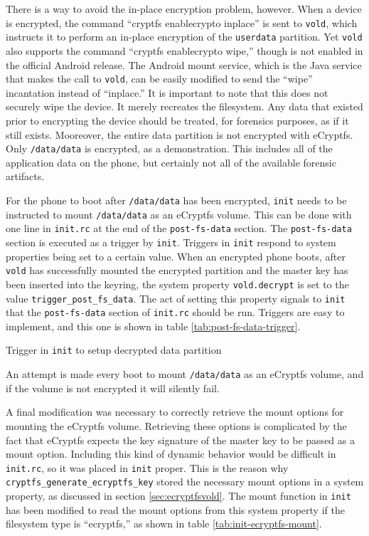 There is a way to avoid the in-place encryption problem, however. When a device is encrypted, the command ``cryptfs enablecrypto
inplace'' is sent to \texttt{vold}, which instructs it to perform an in-place encryption of the \texttt{userdata} partition. Yet
\texttt{vold} also supports the command ``cryptfs enablecrypto wipe,'' though is not enabled in the official Android release. The
Android mount service, which is the Java service that makes the call to \texttt{vold}, can be easily modified to send the ``wipe''
incantation instead of ``inplace.'' It is important to note that this does not securely wipe the device. It merely recreates the
filesystem. Any data that existed prior to encrypting the device should be treated, for forensics purposes, as if it still exists.
Mooreover, the entire data partition is not encrypted with eCryptfs. Only \texttt{/data/data} is encrypted, as a demonstration. This
includes all of the application data on the phone, but certainly not all of the available forensic artifacts.

For the phone to boot after \texttt{/data/data} has been encrypted, \texttt{init} needs to be instructed to mount
\texttt{/data/data} as an eCryptfs volume. This can be done with one line in \texttt{init.rc} at the end of the
\texttt{post-fs-data} section. The \texttt{post-fs-data} section is executed as a trigger by \texttt{init}. Triggers in
\texttt{init} respond to system properties being set to a certain value. When an encrypted phone boots, after \texttt{vold} has
successfully mounted the encrypted partition and the master key has been inserted into the keyring, the system property
\texttt{vold.decrypt} is set to the value \texttt{trigger\_post\_fs\_data}. The act of setting this property signals to
\texttt{init} that the \texttt{post-fs-data} section of \texttt{init.rc} should be run. Triggers are easy to implement, and this one
is shown in table \ref{tab:post-fs-data-trigger}.  
\begin{table}[htpb] 
 
\caption{Trigger in
\texttt{init} to setup decrypted data partition}
\label{tab:post-fs-data-trigger} 
\end{table} 
An attempt is made every boot to mount
\texttt{/data/data} as an eCryptfs volume, and if the volume is not encrypted it will silently fail. 

A final modification was necessary to correctly retrieve the mount options for mounting the eCryptfs volume. Retrieving these
options is complicated by the fact that eCryptfs expects the key signature of the master key to be passed as a mount option.
Including this kind of dynamic behavior would be difficult in \texttt{init.rc}, so it was placed in \texttt{init} proper. This is
the reason why \texttt{cryptfs\_generate\_ecryptfs\_key} stored the necessary mount options in a system property, as discussed in
section \ref{sec:ecryptfsvold}. The mount function in \texttt{init} has been modified to read the mount options from this system
property if the filesystem type is ``ecryptfs,'' as shown in table \ref{tab:init-ecryptfs-mount}.

